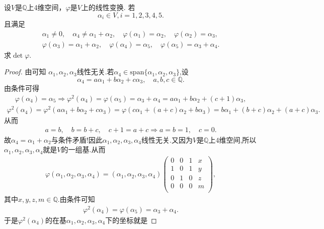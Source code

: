 \documentclass[../../main.tex]{subfiles}%
\begin{document}
\begin{example}
设$V$是$\mathbb{Q}$上4维空间，$\varphi$是$V$上的线性变换. 若
$$\alpha_i \in V, i = 1,2,3,4,5.$$
且满足
\begin{gather*}
\alpha _1\ne 0,\quad \alpha _4\ne \alpha _1+\alpha _2,\quad \varphi( \alpha _1)=\alpha _2,\quad \varphi (\alpha _2)=\alpha _3,
\\
\varphi (\alpha _3)=\alpha _1+\alpha _2,\quad \varphi (\alpha _4)=\alpha _5,\quad \varphi (\alpha _5)=\alpha _3+\alpha _4.
\end{gather*}
求$\det \varphi$.
\end{example}
\begin{proof}
由可知
$\alpha_1,\alpha_2,\alpha_3$线性无关.若$\alpha_4\in \mathrm{span}\{\alpha_1,\alpha_2,\alpha_3\}$,设
$$\alpha_4=a\alpha_1+b\alpha_2+c\alpha_3,\quad a,b,c\in \mathbb{Q}.$$
由条件可得
\begin{align*}
\varphi (\alpha_4)=\alpha_5\Longrightarrow \varphi^2(\alpha_4)=\varphi (\alpha_5)=\alpha_3+\alpha_4=a\alpha_1+b\alpha_2+(c+1)\alpha_3,
\end{align*}
\begin{align*}
\varphi^2(\alpha_4)=\varphi^2(a\alpha_1+b\alpha_2+c\alpha_3)=\varphi\left(c\alpha_1+(a+c)\alpha_2+b\alpha_3\right)=b\alpha_1+(b+c)\alpha_2+(a+c)\alpha_3.
\end{align*}
从而
\begin{align*}
a=b,\quad b=b+c,\quad c+1=a+c\Longrightarrow a=b=1,\quad c=0.
\end{align*}
故$\alpha_4=\alpha_1+\alpha_2$与条件矛盾!因此$\alpha_1,\alpha_2,\alpha_3,\alpha_4$线性无关.又因为$V$是$\mathbb{Q}$上$4$维空间,所以$\alpha_1,\alpha_2,\alpha_3,\alpha_4$就是$V$的一组基.从而
\begin{align*}
\varphi\left( \alpha_1,\alpha_2,\alpha_3,\alpha_4 \right)=\left( \alpha_1,\alpha_2,\alpha_3,\alpha_4 \right)\begin{pmatrix}
0&		0&		1&		x\\
1&		0&		1&		y\\
0&		1&		0&		z\\
0&		0&		0&		m\\
\end{pmatrix},
\end{align*}
其中$x,y,z,m\in \mathbb{Q}$.由条件可知
\begin{align*}
\varphi^2(\alpha_4)=\varphi (\alpha_5)=\alpha_3+\alpha_4.
\end{align*}
于是$\varphi^2(\alpha_4)$的在基$\alpha_1,\alpha_2,\alpha_3,\alpha_4$下的坐标就是

\end{proof}
\end{document}
